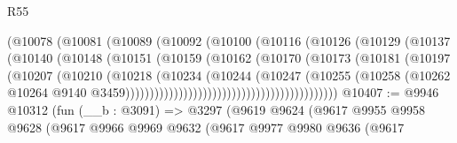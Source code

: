 \begin{lexlean}{R55}
\begin{coremodule}
                                      (@10078
                                        (@10081
                                          (@10089
                                            (@10092
                                              (@10100
                                                (@10116
                                                  (@10126
                                                    (@10129
                                                      (@10137
                                                        (@10140
                                                          (@10148
                                                            (@10151
                                                              (@10159
                                                                (@10162
                                                                  (@10170
                                                                    (@10173
                                                                      (@10181
                                                                        (@10197
                                                                          (@10207
                                                                            (@10210
                                                                              (@10218
                                                                                (@10234
                                                                                  (@10244
                                                                                    (@10247
                                                                                      (@10255
                                                                                        (@10258
                                                                                          (@10262
                                                                                            @10264
                                                                                            @9140
                                                                                            @3459))))))))))))))))))))))))))))))))))))))))))))
@10407 := @9946
    @10312
    (fun (__b : @3091) =>
    @3297
      (@9619
        @9624
        (@9617
          @9955
          @9958
          @9628
          (@9617
            @9966
            @9969
            @9632
            (@9617
              @9977
              @9980
              @9636
              (@9617

\end{coremodule}
\end{lexlean}
